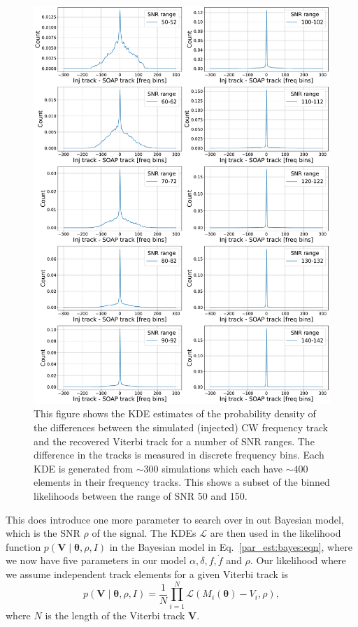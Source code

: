 \begin{figure}[hpt]

    \centering
    \includegraphics[width=\linewidth]{C5_parameter/KDE_range_50_100.pdf}
    \caption[KDE of likelihood in different \gls{SNR} ranges]{This figure shows the \gls{KDE} estimates of the probability density of the differences between the simulated (injected) \gls{CW} frequency track and the recovered Viterbi track for a number of \gls{SNR} ranges. The difference in the tracks is measured in discrete frequency bins. Each \gls{KDE} is generated from $\sim 300$ simulations which each have $\sim 400$ elements in their frequency tracks. This shows a subset of the binned likelihoods between the range of \gls{SNR} 50 and 150.}
    \label{par_est:bayes:likelihood:kde142}
    
    \end{figure}
%

This does introduce one more parameter to search over in out Bayesian model, which is the \gls{SNR} $\rho$ of the signal.
The \glspl{KDE} $\mathcal{L}$ are then used in the likelihood function $p(\bm{V} \mid \bm{\theta}, \rho, I)$ in the Bayesian model in Eq.~\ref{par_est:bayes:eqn}, where we now have five parameters in our model $\alpha, \delta, f, \dot{f}$ and $\rho$.
Our likelihood where we assume independent track elements for a given Viterbi track is
\begin{equation}
    p(\bm{V} \mid \bm{\theta}, \rho, I) = \frac{1}{N}\prod_{i = 1}^{N} \mathcal{L}(M_i(\bm{\theta}) - V_i, \rho) ,
\end{equation}
where $N$ is the length of the Viterbi track $\bm{V}$. 

